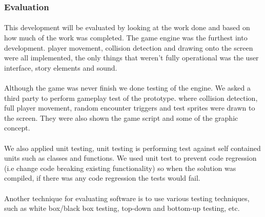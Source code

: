 \documentclass{article}
\begin{document}
\subsubsection{Evaluation}
\paragraph{}
This development will be evaluated by looking at the work done and based on how much of the work was completed. The game engine was the furthest into development. player movement, collision detection and drawing onto the screen were all implemented, the only things that weren't fully operational was the user interface, story elements and sound. 
\paragraph{} 
Although the game was never finish we done testing of the engine. We asked a third party to perform gameplay test of the prototype. where collision detection, full player movement, random encounter triggers and test sprites were drawn to the screen. They were also shown the game script and some of the graphic concept. 
\paragraph{}
We also applied unit testing, unit testing is performing test against self contained units such as classes and functions. We used unit test to prevent code regression (i.e change code breaking existing functionality) so when the solution was compiled, if there was any code regression the tests would fail.
\paragraph{}
Another technique for evaluating software is to use various testing techniques, such as white box/black box testing, top-down and bottom-up testing, etc.


\end{document}
